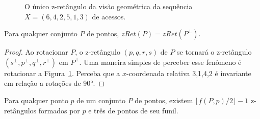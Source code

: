 \begin{figure}
    \caption{O único z-retângulo da visão geométrica da sequência $X = (6,4,2,5,1,3)$ de acessos.}
\label{fig:z-retangulo-isolado}
\end{figure}

\begin{lemma}\label{lemma:p-inversivel}
    Para qualquer conjunto $P$ de pontos, $zRet(P) = zRet(P^{\perp})$.
\end{lemma}

\begin{proof}
    Ao rotacionar $P$, o z-retângulo $(p,q,r,s)$ de $P$ se tornará o z-retângulo $(s^{\perp},p^{\perp},q^{\perp},r^{\perp})$ em $P^{\perp}$. Uma maneira simples de perceber esse fenômeno é rotacionar a Figura~\ref{fig:z-retangulo-isolado}. Perceba que a $x$-coordenada relativa 3,1,4,2 é invariante em relação a rotações de 90°.
\end{proof}

\begin{lemma}
    Para qualquer ponto $p$ de um conjunto $P$ de pontos, existem $\lfloor f(P,p)/2 \rfloor - 1$ z-retângulos formados por $p$ e três de pontos de seu funil.
\end{lemma}

